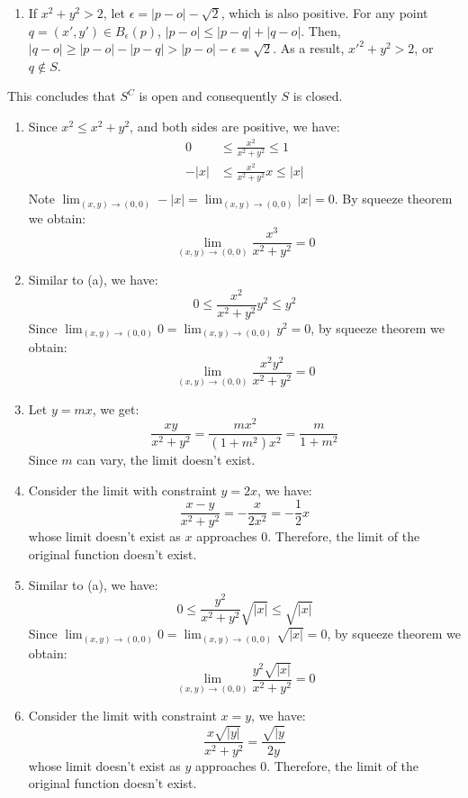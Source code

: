 \documentclass{homework}
\begin{document}
\begin{problem}{5}
\begin{enumerate}
\begin{enumerate}
\item If $x^2 + y^2 > 2$, let $\epsilon = |p - o| - \sqrt{2}$, which is also positive. For any point $q = (x', y') \in B_{\epsilon}(p)$, $|p - o| \leq |p - q| + |q - o|$. Then, $|q - o| \geq |p - o| - |p - q| > |p - o| - \epsilon = \sqrt{2}$. As a result, $x'^2 + y^2 > 2$, or $q \notin S$.
\end{enumerate}

This concludes that $S^C$ is open and consequently $S$ is closed. \QED

\end{enumerate}
\end{problem}

\begin{problem}{6}
\begin{enumerate}
\item Since $x^2 \leq x^2 + y^2$, and both sides are positive, we have:
\begin{align*}
0    &\leq \frac{x^2}{x^2 + y^2}  \leq 1   \\
-|x| &\leq \frac{x^2}{x^2 + y^2}x \leq |x| \\
\end{align*}
Note $\lim_{(x,y) \to (0, 0)} -|x| = \lim_{(x,y) \to (0, 0)} |x| = 0$. By squeeze theorem we obtain:
$$\lim_{(x,y) \to (0, 0)} \frac{x^3}{x^2 + y^2} = 0$$

\item Similar to (a), we have:
$$0 \leq \frac{x^2}{x^2+y^2}y^2 \leq y^2$$
Since $\lim_{(x,y) \to (0, 0)} 0 = \lim_{(x,y) \to (0, 0)} y^2 = 0$, by squeeze theorem we obtain:
$$\lim_{(x,y) \to (0, 0)} \frac{x^2y^2}{x^2 + y^2} = 0$$

\item Let $y = mx$, we get:
$$\frac{xy}{x^2 + y^2} = \frac{mx^2}{(1+m^2)x^2} = \frac{m}{1+m^2}$$
Since $m$ can vary, the limit doesn't exist.

\item Consider the limit with constraint $y = 2x$, we have:
$$\frac{x-y}{x^2+y^2} = -\frac{x}{2x^2} = -\frac{1}{2}x$$
whose limit doesn't exist as $x$ approaches $0$. Therefore, the limit of the original function doesn't exist.

\item Similar to (a), we have:
$$0 \leq \frac{y^2}{x^2+y^2}\sqrt{|x|} \leq \sqrt{|x|}$$
Since $\lim_{(x,y) \to (0, 0)} 0 = \lim_{(x,y) \to (0, 0)} \sqrt{|x|} = 0$, by squeeze theorem we obtain:
$$\lim_{(x,y) \to (0, 0)}\frac{y^2\sqrt{|x|}}{x^2+y^2} = 0$$

\item Consider the limit with constraint $x = y$, we have:
$$\frac{x\sqrt{|y|}}{x^2+y^2} = \frac{\sqrt{|y}}{2y}$$
whose limit doesn't exist as $y$ approaches $0$. Therefore, the limit of the original function doesn't exist.
\end{enumerate}
\end{problem}
\end{document}
